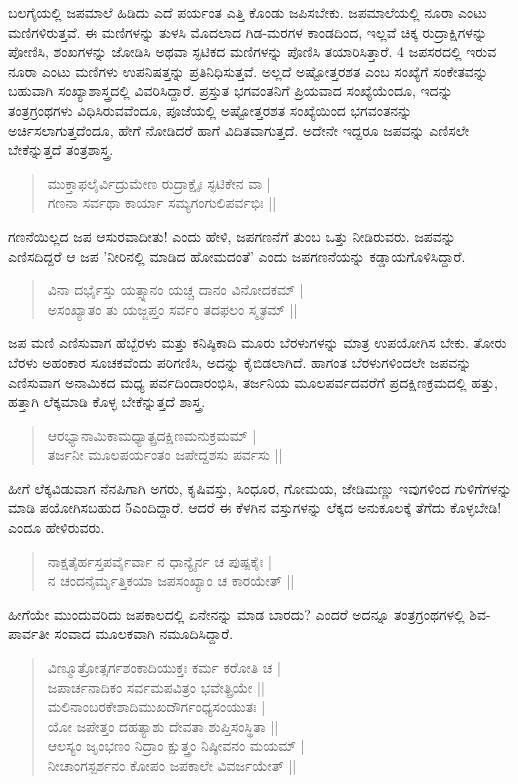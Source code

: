ಬಲಗೈಯಲ್ಲಿ ಜಪಮಾಲೆ ಹಿಡಿದು ಎದೆ ಪರ್ಯಂತ ಎತ್ತಿ ಕೊಂಡು ಜಪಿಸಬೇಕು. ಜಪಮಾಲೆಯಲ್ಲಿ ನೂರಾ ಎಂಟು ಮಣಿಗಳಿರುತ್ತವೆ. ಈ ಮಣಿಗಳನ್ನು ತುಳಸಿ ಮೊದಲಾದ ಗಿಡ-ಮರಗಳ ಕಾಂಡದಿಂದ, ಇಲ್ಲವೆ ಚಿಕ್ಕ ರುದ್ರಾಕ್ಷಿಗಳನ್ನು ಪೋಣಿಸಿ, ಶಂಖಗಳನ್ನು ಜೋಡಿಸಿ ಅಥವಾ ಸ್ಫಟಿಕದ ಮಣಿಗಳನ್ನು ಪೊಣಿಸಿ ತಯಾರಿಸಿತ್ತಾರೆ. 4 ಜಪಸರದಲ್ಲಿ ಇರುವ ನೂರಾ ಎಂಟು ಮಣಿಗಳು ಉಪನಿಷತ್ತನ್ನು ಪ್ರತಿನಿಧಿಸುತ್ತವೆ. ಅಲ್ಲದೆ ಅಷ್ಟೋತ್ತರಶತ ಎಂಬ ಸಂಖ್ಯೆಗೆ ಸಂಕೇತವನ್ನು ಬಹುವಾಗಿ ಸಂಖ್ಯಾಶಾಸ್ತ್ರದಲ್ಲಿ ವಿವರಿಸಿದ್ದಾರೆ. ಪ್ರಸ್ತುತ ಭಗವಂತನಿಗೆ ಪ್ರಿಯವಾದ ಸಂಖ್ಯೆಯೆಂದೂ, ಇದನ್ನು ತಂತ್ರಗ್ರಂಥಗಳು ವಿಧಿಸಿರುವವೆಂದೂ, ಪೂಜೆಯಲ್ಲಿ ಅಷ್ಟೋತ್ತರಶತ ಸಂಖ್ಯೆಯಿಂದ ಭಗವಂತನನ್ನು ಅರ್ಚಿಸಲಾಗುತ್ತದೆಂದೂ, ಹೇಗೆ ನೋಡಿದರೆ ಹಾಗೆ ವಿದಿತವಾಗುತ್ತದೆ. ಅದೇನೇ ಇದ್ದರೂ ಜಪವನ್ನು ಎಣಿಸಲೇ ಬೇಕೆನ್ನುತ್ತದೆ ತಂತ್ರಶಾಸ್ತ್ರ.
\begin{verse}
ಮುಕ್ತಾಫಲೈರ್ವಿದ್ರುಮೇಣ ರುದ್ರಾಕ್ಷೈಃ ಸ್ಫಟಿಕೇನ ವಾ |\\
ಗಣನಾ ಸರ್ವಥಾ ಕಾರ್ಯಾ ಸಮ್ಯಗಂಗುಲಿಪರ್ವಭಿಃ ||
\end{verse}
ಗಣನೆಯಿಲ್ಲದ ಜಪ ಆಸುರವಾದೀತು! ಎಂದು ಹೇಳಿ, ಜಪಗಣನೆಗೆ ತುಂಬ ಒತ್ತು ನೀಡಿರುವರು. ಜಪವನ್ನು ಎಣಿಸದಿದ್ದರೆ ಆ ಜಪ ’ನೀರಿನಲ್ಲಿ ಮಾಡಿದ ಹೋಮದಂತೆ’ ಎಂದು ಜಪಗಣನೆಯನ್ನು ಕಡ್ಡಾಯಗೊಳಿಸಿದ್ದಾರೆ.
\begin{verse}
ವಿನಾ ದರ್ಭೈಸ್ತು ಯತ್ಸ್ನಾನಂ ಯಚ್ಚ ದಾನಂ ವಿನೋದಕಮ್ |\\
ಅಸಂಖ್ಯಾತಂ ತು ಯಜ್ಜಪ್ತಂ ಸರ್ವಂ ತದಫಲಂ ಸ್ಮೃತಮ್ ||
\end{verse}
ಜಪ ಮಣಿ ಎಣಿಸುವಾಗ ಹೆಬ್ಬೆರಳು ಮತ್ತು ಕನಿಷ್ಠಿಕಾದಿ ಮೂರು ಬೆರಳುಗಳನ್ನು ಮಾತ್ರ ಉಪಯೋಗಿಸ ಬೇಕು. ತೋರು ಬೆರಳು ಅಹಂಕಾರ ಸೂಚಕವೆಂದು ಪರಿಗಣಿಸಿ, ಅದನ್ನು ಕೈಬಿಡಲಾಗಿದೆ. ಹಾಗಂತ ಬೆರಳುಗಳಿಂದಲೇ ಜಪವನ್ನು ಎಣಿಸುವಾಗ ಅನಾಮಿಕದ ಮಧ್ಯ ಪರ್ವದಿಂದಾರಂಭಿಸಿ, ತರ್ಜನಿಯ ಮೂಲಪರ್ವದವರೆಗೆ ಪ್ರದಕ್ಷಿಣಕ್ರಮದಲ್ಲಿ ಹತ್ತು, ಹತ್ತಾಗಿ ಲೆಕ್ಕಮಾಡಿ ಕೊಳ್ಳ ಬೇಕೆನ್ನುತ್ತದೆ ಶಾಸ್ತ್ರ.
\begin{verse}
ಆರಭ್ಯಾನಾಮಿಕಾಮಧ್ಯಾತ್ಪ್ರದಕ್ಷಿಣಮನುಕ್ರಮಮ್ |\\
ತರ್ಜನೀ ಮೂಲಪರ್ಯಂತಂ ಜಪೇದ್ದಶಸು ಪರ್ವಸು || 
\end{verse}
ಹೀಗೆ ಲೆಕ್ಕವಿಡುವಾಗ ನೆನಪಿಗಾಗಿ ಅಗರು, ಕೃಷಿವಸ್ತು, ಸಿಂಧೂರ, ಗೋಮಯ, ಜೇಡಿಮಣ್ಣು ಇವುಗಳಿಂದ ಗುಳಿಗೆಗಳನ್ನು ಮಾಡಿ ಪಯೋಗಿಸಬಹುದ 5ಎಂದಿದ್ದಾರೆ. ಆದರೆ ಈ ಕೆಳಗಿನ ವಸ್ತುಗಳನ್ನು ಲೆಕ್ಕದ ಅನುಕೂಲಕ್ಕೆ ತೆಗೆದು ಕೊಳ್ಳಬೇಡಿ! ಎಂದೂ ಹೇಳಿರುವರು.
\begin{verse}
ನಾಕ್ಷತೈರ್ಹಸ್ತಪರ್ವೈರ್ವಾ ನ ಧಾನ್ಯೈರ್ನ ಚ ಪುಷ್ಪಕೈಃ |\\
ನ ಚಂದನೈರ್ಮೃತ್ತಿಕಯಾ ಜಪಸಂಖ್ಯಾಂ ಚ ಕಾರಯೇತ್ ||
\end{verse}
ಹೀಗೆಯೇ ಮುಂದುವರಿದು ಜಪಕಾಲದಲ್ಲಿ ಏನೇನನ್ನು ಮಾಡ ಬಾರದು? ಎಂದರೆ ಅದನ್ನೂ ತಂತ್ರಗ್ರಂಥಗಳಲ್ಲಿ ಶಿವ-ಪಾರ್ವತೀ ಸಂವಾದ ಮೂಲಕವಾಗಿ ನಮೂದಿಸಿದ್ದಾರೆ.
\begin{verse}
ವಿಣ್ಮೂತ್ರೋತ್ಸರ್ಗಶಂಕಾದಿಯುಕ್ತಃ ಕರ್ಮ ಕರೋತಿ ಚ |\\
ಜಪಾರ್ಚನಾದಿಕಂ ಸರ್ವಮಪವಿತ್ರಂ ಭವೇತ್ಪ್ರಿಯೇ ||\\
ಮಲಿನಾಂಬರಕೇಶಾದಿಮುಖದೌರ್ಗಂಧ್ಯಸಂಯುತಃ |\\
ಯೋ ಜಪೇತ್ತಂ ದಹತ್ಯಾಶು ದೇವತಾ ಶುಪ್ತಿಸಂಸ್ಥಿತಾ ||\\
ಆಲಸ್ಯಂ ಜೃಂಭಣಂ ನಿದ್ರಾಂ ಕ್ಷುತ್ತ್ರಂ ನಿಷ್ಠೀವನಂ ಮಯಮ್ |\\
ನೀಚಾಂಗಸ್ಪರ್ಶನಂ ಕೋಪಂ ಜಪಕಾಲೇ ವಿವರ್ಜಯೇತ್ ||
\end{verse}
